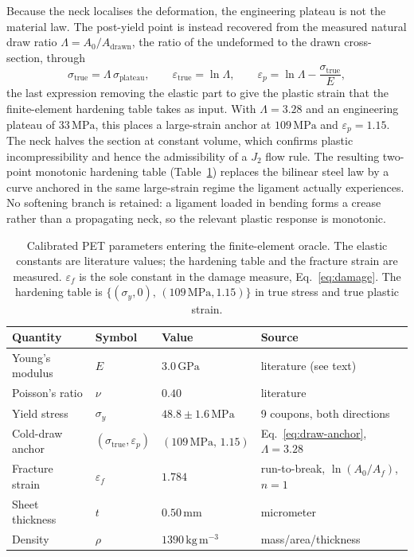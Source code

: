 \documentclass[pdflatex,sn-mathphys-num]{sn-jnl}%
\theoremstyle{thmstyleone}%
\theoremstyle{thmstyletwo}%
\theoremstyle{thmstylethree}%
\begin{document}
Because the neck localises the deformation, the engineering plateau is not the
material law. The post-yield point is instead recovered from the measured natural
draw ratio $\Lambda=A_0/A_{\mathrm{drawn}}$, the ratio of the undeformed to the
drawn cross-section, through
\begin{equation}
  \sigma_{\mathrm{true}} = \Lambda\,\sigma_{\mathrm{plateau}},
  \qquad
  \varepsilon_{\mathrm{true}} = \ln\Lambda,
  \qquad
  \varepsilon_p = \ln\Lambda - \frac{\sigma_{\mathrm{true}}}{E},
  \label{eq:draw-anchor}
\end{equation}
the last expression removing the elastic part to give the plastic strain that the
finite-element hardening table takes as input. With $\Lambda=3.28$ and an
engineering plateau of $33\,\mathrm{MPa}$, this places a large-strain anchor at
$109\,\mathrm{MPa}$ and $\varepsilon_p=1.15$. The neck halves the section at
constant volume, which confirms plastic incompressibility and hence the
admissibility of a $J_2$ flow rule. The resulting two-point monotonic hardening
table (Table~\ref{tab:pet-params}) replaces the bilinear steel law by a curve
anchored in the same large-strain regime the ligament actually experiences. No
softening branch is retained: a ligament loaded in bending forms a crease rather
than a propagating neck, so the relevant plastic response is monotonic.

\begin{table}[h!]
\centering
\begin{tabular}{llll}
\toprule
\textbf{Quantity} & \textbf{Symbol} & \textbf{Value} & \textbf{Source} \\
\midrule
Young's modulus        & $E$                          & $3.0\,\mathrm{GPa}$              & literature (see text) \\
Poisson's ratio        & $\nu$                        & $0.40$                           & literature \\
Yield stress           & $\sigma_y$                   & $48.8\pm1.6\,\mathrm{MPa}$       & 9 coupons, both directions \\
Cold-draw anchor       & $(\sigma_{\mathrm{true}},\varepsilon_p)$ & $(109\,\mathrm{MPa},\,1.15)$ & Eq.~\eqref{eq:draw-anchor}, $\Lambda=3.28$ \\
Fracture strain        & $\varepsilon_f$              & $1.784$                          & run-to-break, $\ln(A_0/A_f)$, $n=1$ \\
Sheet thickness        & $t$                          & $0.50\,\mathrm{mm}$              & micrometer \\
Density                & $\rho$                       & $1390\,\mathrm{kg\,m^{-3}}$      & mass/area/thickness \\
\bottomrule
\end{tabular}
\caption{Calibrated PET parameters entering the finite-element oracle. The elastic
constants are literature values; the hardening table and the fracture strain are
measured. $\varepsilon_f$ is the sole constant in the damage measure,
Eq.~\eqref{eq:damage}. The hardening table is
$\{(\sigma_y,0),\,(109\,\mathrm{MPa},1.15)\}$ in true stress and true plastic
strain.}
\label{tab:pet-params}
\end{table}
\end{document}
